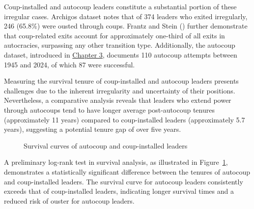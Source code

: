 \documentclass[
  12pt,
]{report}
\begin{document}
Coup-installed and autocoup leaders constitute a substantial portion of
these irregular cases. Archigos dataset notes that of 374 leaders who
exited irregularly, 246 (65.8\%) were ousted through coups. Frantz and
Stein () further demonstrate that
coup-related exits account for approximately one-third of all exits in
autocracies, surpassing any other transition type. Additionally, the
autocoup dataset, introduced in \hyperref[sec-chapter3]{Chapter 3},
documents 110 autocoup attempts between 1945 and 2024, of which 87 were
successful.

Measuring the survival tenure of coup-installed and autocoup leaders
presents challenges due to the inherent irregularity and uncertainty of
their positions. Nevertheless, a comparative analysis reveals that
leaders who extend power through autocoups tend to have longer average
post-autocoup tenures (approximately 11 years) compared to
coup-installed leaders (approximately 5.7 years), suggesting a potential
tenure gap of over five years.

\begin{figure}


\caption{\label{fig-logrank}Survival curves of autocoup and
coup-installed leaders}

\end{figure}%

A preliminary log-rank test in survival analysis, as illustrated in
Figure~\ref{fig-logrank}, demonstrates a statistically significant
difference between the tenures of autocoup and coup-installed leaders.
The survival curve for autocoup leaders consistently exceeds that of
coup-installed leaders, indicating longer survival times and a reduced
risk of ouster for autocoup leaders.
\end{document}
